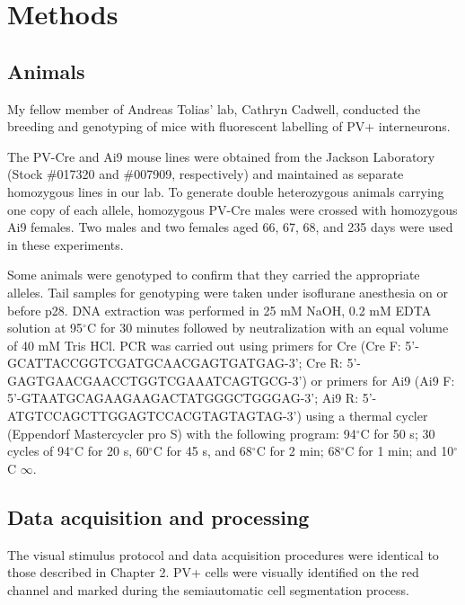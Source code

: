 \section{Methods}
\subsection{Animals}

My fellow member of Andreas Tolias' lab, Cathryn Cadwell, conducted the breeding and genotyping of mice with fluorescent labelling of PV+ interneurons.

The PV-Cre and Ai9 mouse lines were obtained from the Jackson Laboratory (Stock \#017320 and \#007909, respectively) and maintained as separate homozygous lines in our lab.  To generate double heterozygous animals carrying one copy of each allele, homozygous PV-Cre males were crossed with homozygous Ai9 females. Two males and two females aged 66, 67, 68, and 235 days were used in these experiments. 

Some animals were genotyped to confirm that they carried the appropriate alleles. Tail samples for genotyping were taken under isoflurane anesthesia on or before p28.  DNA extraction was performed in 25 mM NaOH, 0.2 mM EDTA solution at 95$^\circ$C for 30 minutes followed by neutralization with an equal volume of 40 mM Tris HCl.  PCR was carried out using primers for Cre (Cre F: 5'-GCATTA\-CCG\-GTC\-GAT\-GCA\-ACG\-AGT\-GATGAG-3'; Cre R: 5'-GAGTGA\-ACG\-AAC\-CTG\-GTC\-GAA\-ATC\-AGTGCG-3') or primers for Ai9 (Ai9 F: 5'-GTAATG\-CAG\-AAG\-AAG\-ACT\-ATG\-GGC\-TGGGAG-3'; Ai9 R: 5'-ATGTCC\-AGC\-TTG\-GAG\-TCC\-ACG\-TAG\-TAGTAG-3') using a thermal cycler (Eppendorf Mastercycler pro S) with the following program: 94$^\circ$C for 50 s; 30 cycles of 94$^\circ$C for 20 s, 60$^\circ$C for 45 s, and 68$^\circ$C for 2 min; 68$^\circ$C for 1 min; and 10$^\circ$C $\infty$.

\subsection{Data acquisition and processing}
The visual stimulus protocol and  data acquisition procedures  were identical to those described in Chapter 2. PV+ cells were visually identified on the red channel and marked during the semiautomatic cell segmentation process.
